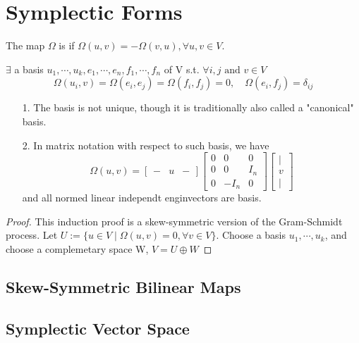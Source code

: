 \documentclass{paper}
\begin{document}
\section{Symplectic Forms}
\begin{definition}
The map $\Omega$  is  if $\Omega(u,v)=-\Omega(v,u), \forall u,v\in V$.
\end{definition}
\begin{thm}
$\exists$ a basis $u_1,\cdots,u_k,e_1,\cdots,e_n,f_1,\cdots,f_n$ of V s.t. $\forall i,j \text{ and } v\in V$
\begin{equation*}
\Omega(u_i,v)=\Omega(e_i,e_j)=\Omega(f_i,f_j)=0,\quad\Omega(e_i,f_j)=\delta_{ij}
\end{equation*}
\end{thm}
\begin{remark*}
\begin{enumerate}
\item[1.] The basis is not unique, though it is traditionally also called a "canonical" basis.
\item[2.] In matrix notation with respect to such basis, we have 
\begin{equation*}
\Omega(u,v)=
\begin{bmatrix}
- & u & -
\end{bmatrix}
\begin{bmatrix}
0 & 0 & 0 \\
0 & 0 & I_n \\
0 &-I_n& 0
\end{bmatrix}
\begin{bmatrix}
| \\
v \\
|
\end{bmatrix}
\end{equation*}
and all normed linear independt enginvectors are basis. 
\end{enumerate}
\end{remark*}
\begin{proof}
This induction proof is a skew-symmetric version of the Gram-Schmidt process. Let $U:=\{u\in V\mid 
\Omega(u,v)=0,\forall v\in V\}$. Choose a basis $u_1,\cdots,u_k$, and choose a complemetary space W,
$V=U\oplus W$
\end{proof}
\subsection{Skew-Symmetric Bilinear Maps}
\subsection{Symplectic Vector Space}
\end{document}
